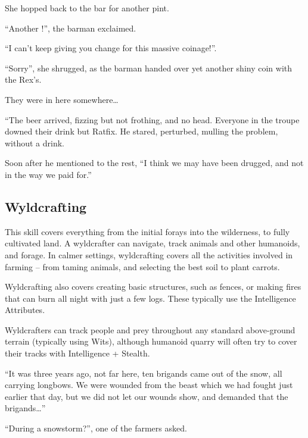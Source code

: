 \begin{multicols}{2}
\begin{exampletext}
  She hopped back to the bar for another pint.

  ``Another !'',
  the barman exclaimed.

  ``I can't keep giving you change for this massive coinage!''.

  ``Sorry'',
  she shrugged, as the barman handed over yet another shiny coin with the Rex's.

  They were in here somewhere\ldots

\end{exampletext}

\else

\begin{exampletext}
  ``The beer arrived, fizzing but not frothing, and no head.
  Everyone in the troupe downed their drink but Ratfix.
  He stared, perturbed, mulling the problem, without a drink.

  Soon after he mentioned to the rest,
  ``I think we may have been drugged, and not in the way we paid for.''
\end{exampletext}
\fi

\subsection{Wyldcrafting}

This skill covers everything from the initial forays into the wilderness, to fully cultivated land.
A wyldcrafter can navigate, track animals and other humanoids, and forage.
In calmer settings, wyldcrafting covers all the activities involved in farming -- from taming animals, and selecting the best soil to plant carrots.

Wyldcrafting also covers creating basic structures, such as fences, or making fires that can burn all night with just a few logs.
These typically use the Intelligence Attributes.

Wyldcrafters can track people and prey throughout any standard above-ground terrain (typically using Wits), although humanoid quarry will often try to cover their tracks with Intelligence + Stealth.

\begin{exampletext}
  ``It was three years ago, not far here, ten brigands came out of the snow, all carrying longbows.
  We were wounded from the beast which we had fought just earlier that day, but we did not let our wounds show, and demanded that the brigands\ldots''

  ``During a snowstorm?'', one of the farmers asked.


\end{exampletext}
\end{multicols}
